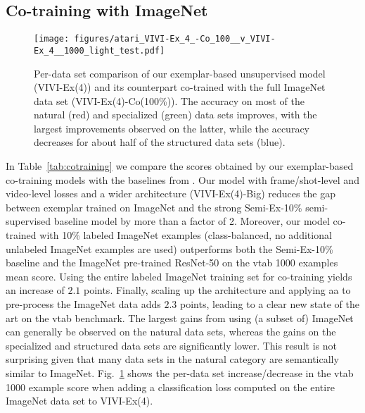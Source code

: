 \documentclass[10pt,twocolumn,letterpaper]{article}
\begin{document}
\subsection{Co-training with ImageNet}
\begin{figure}[t!]
\vspace{-0.2cm}
\centering
\texttt{[image: figures/atari\_VIVI-Ex\_4\_-Co\_100\_\_v\_VIVI-Ex\_4\_\_1000\_light\_test.pdf]}
\vspace{-0.3cm}
\caption{Per-data set comparison of our exemplar-based unsupervised model (VIVI-Ex(4)) and its counterpart co-trained with the full ImageNet data set (VIVI-Ex(4)-Co(100\%)). The accuracy on most of the natural (red) and specialized (green) data sets improves, with the largest improvements observed on the latter, while the accuracy decreases for about half of the structured data sets (blue).}
\label{fig:atari1}
\vspace{-0.1cm}
\end{figure}
In Table~\ref{tab:cotraining} we compare the scores obtained by our exemplar-based co-training models with the baselines from \cite{zhai2019visual}. Our model with frame/shot-level and video-level losses and a wider architecture (VIVI-Ex(4)-Big) reduces the gap between exemplar trained on ImageNet and the strong Semi-Ex-10\% semi-supervised baseline model by more than a factor of 2. Moreover, our model co-trained with 10\% labeled ImageNet examples (class-balanced, no additional unlabeled ImageNet examples are used) outperforms both the Semi-Ex-10\% baseline and the ImageNet pre-trained ResNet-50 on the \gls{vtab} 1000 examples mean score. Using the entire labeled ImageNet training set for co-training yields an increase of $2.1$ points. Finally, scaling up the architecture and applying \gls{aa} to pre-process the ImageNet data adds $2.3$ points, leading to a clear new state of the art on the \gls{vtab} benchmark. The largest gains from using (a subset of) ImageNet can generally be observed on the natural data sets, whereas the gains on the specialized and structured data sets are significantly lower. This result is not surprising given that many data sets in the natural category are semantically similar to ImageNet. Fig.~\ref{fig:atari1} shows the per-data set increase/decrease in the \gls{vtab} 1000 example score when adding a classification loss computed on the entire ImageNet data set to VIVI-Ex(4).

\vspace{1mm}
\end{document}
